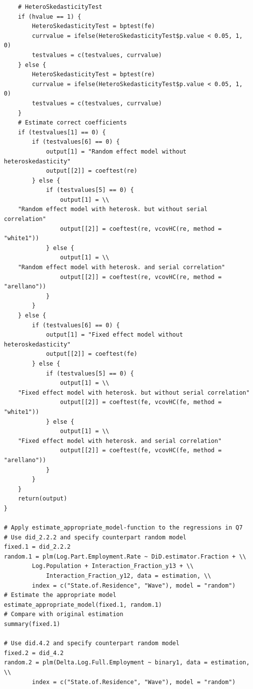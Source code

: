 \documentclass[a4paper]{article}
\begin{document}
{\begin{lstlisting}
    # HeteroSkedasticityTest
    if (hvalue == 1) {
        HeteroSkedasticityTest = bptest(fe)
        currvalue = ifelse(HeteroSkedasticityTest$p.value < 0.05, 1, 0)
        testvalues = c(testvalues, currvalue)
    } else {
        HeteroSkedasticityTest = bptest(re)
        currvalue = ifelse(HeteroSkedasticityTest$p.value < 0.05, 1, 0)
        testvalues = c(testvalues, currvalue)
    }
    # Estimate correct coefficients
    if (testvalues[1] == 0) {
        if (testvalues[6] == 0) {
            output[1] = "Random effect model without heteroskedasticity"
            output[[2]] = coeftest(re)
        } else {
            if (testvalues[5] == 0) {
                output[1] = \\
	"Random effect model with heterosk. but without serial correlation"
                output[[2]] = coeftest(re, vcovHC(re, method = "white1"))
            } else {
                output[1] = \\
	"Random effect model with heterosk. and serial correlation"
                output[[2]] = coeftest(re, vcovHC(re, method = "arellano"))
            }
        }
    } else {
        if (testvalues[6] == 0) {
            output[1] = "Fixed effect model without heteroskedasticity"
            output[[2]] = coeftest(fe)
        } else {
            if (testvalues[5] == 0) {
                output[1] = \\
	"Fixed effect model with heterosk. but without serial correlation"
                output[[2]] = coeftest(fe, vcovHC(fe, method = "white1"))
            } else {
                output[1] = \\
	"Fixed effect model with heterosk. and serial correlation"
                output[[2]] = coeftest(fe, vcovHC(fe, method = "arellano"))
            }
        }
    }
    return(output)
}

# Apply estimate_appropriate_model-function to the regressions in Q7 
# Use did_2.2.2 and specify counterpart random model
fixed.1 = did_2.2.2
random.1 = plm(Log.Part.Employment.Rate ~ DiD.estimator.Fraction + \\
		Log.Population + Interaction_Fraction_y13 + \\
        	Interaction_Fraction_y12, data = estimation, \\
		index = c("State.of.Residence", "Wave"), model = "random")
# Estimate the appropriate model
estimate_appropriate_model(fixed.1, random.1)
# Compare with original estimation
summary(fixed.1)

# Use did.4.2 and specify counterpart random model
fixed.2 = did_4.2
random.2 = plm(Delta.Log.Full.Employment ~ binary1, data = estimation, \\
		index = c("State.of.Residence", "Wave"), model = "random")


\end{lstlisting}}
\end{document}
